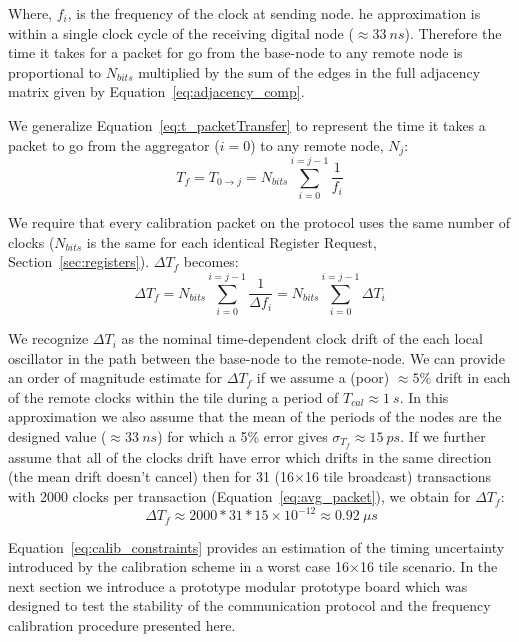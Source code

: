 Where, $f_{i}$, is the frequency of the clock at sending node. 
he approximation is within a single clock cycle of the receiving digital node ($\approx 33~\unit{ns}$).
Therefore the time it takes for a packet for go from the base-node to any remote node is proportional to $N_{bits}$ multiplied by the sum of the edges in the full adjacency matrix given by Equation~\ref{eq:adjacency_comp}.

We generalize Equation~\ref{eq:t_packetTransfer} to represent the time it takes a packet to go from the aggregator ($i = 0$) to any remote node, $N_{j}$:
\begin{equation}
  T_{f} = T_{0\rightarrow j} = N_{bits}\sum_{i=0}^{i=j-1}\frac{1}{f_{i}}
\end{equation}

We require that every calibration packet on the protocol uses the same number of clocks ($N_{bits}$ is the same for each identical Register Request, Section~\ref{sec:registers}).
$\Delta T_{f}$ becomes:
\begin{equation}
  \Delta T_{f} = N_{bits}\sum_{i=0}^{i=j-1}\frac{1}{\Delta f_{i}} = N_{bits} \sum_{i=0}^{i=j-1}\Delta T_{i}
\end{equation}

We recognize $\Delta T_{i}$ as the nominal time-dependent clock drift of the each local oscillator in the path between the base-node to the remote-node.
We can provide an order of magnitude estimate for $\Delta T_{f}$ if we assume a (poor) $\approx 5\%$ drift in each of the remote clocks within the tile during a period of $T_{cal} \approx 1~\unit{s}$.
In this approximation we also assume that the mean of the periods of the nodes are the designed value ($\approx 33~\unit{ns}$) for which a 5\% error gives $\sigma_{T_{f}} \approx 15~\unit{ps}$.
If we further assume that all of the clocks drift have error which drifts in the same direction (the mean drift doesn't cancel) then for 31 (16$\times$16 tile broadcast) transactions with 2000 clocks per transaction (Equation~\ref{eq:avg_packet}), we obtain for $\Delta T_{f}$:
\begin{equation}~\label{eq:calib_constraints}
  \Delta T_{f} \approx 2000 * 31 * 15\times 10^{-12} \approx 0.92~\unit{\mu s} 
\end{equation}

Equation~\ref{eq:calib_constraints} provides an estimation of the timing uncertainty introduced by the calibration scheme in a worst case 16$\times$16 tile scenario.
In the next section we introduce a prototype modular prototype board which was designed to test the stability of the communication protocol and the frequency calibration procedure presented here.

